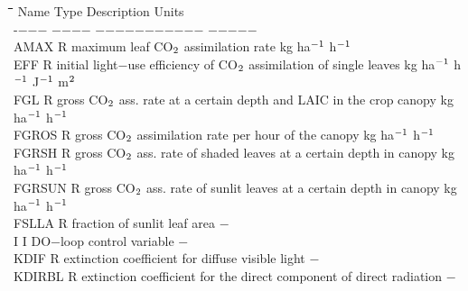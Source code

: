 \begin{tabbing}
\hspace{1.27cm}\=\hspace{1.27cm}\=\hspace{1.27cm}\=\hspace{1.27cm}\=%
\hspace{1.27cm}\=\hspace{1.27cm}\=\hspace{1.27cm}\=\hspace{1.27cm}\=%
\hspace{1.27cm}\=\hspace{1.27cm}\=\kill
Name \> \> Type \> Description                                       \> \> \> \> \> \> \> Units\\
-$-$$-$$-$ \> \> $-$$-$$-$$-$\> $-$$-$$-$$-$$-$$-$$-$$-$$-$$-$$-$                                        \> \> \> \> \> \> \> $-$$-$$-$$-$$-$ \\
AMAX\> \> R   \> maximum leaf CO$_{{\rm 2}}$ assimilation rate       \> \> \> \> \> \> \> kg ha$^{{\rm -1}}$ h$^{{\rm -1}}$ \\
EFF \> \> R   \> initial light$-$use efficiency of CO$_{{\rm 2}}$ assimilation of single leaves  \> \> \> \> \> \> \> kg ha$^{{\rm -1}}$ h$^{{\rm -1}}$  J$^{{\rm -1}}$ m$^{{\rm 2}}$\\
FGL \> \> R   \> gross CO$_{{\rm 2}}$ ass. rate at a certain depth and LAIC in the crop canopy\> \> \> \> \> \> \> kg ha$^{{\rm -1}}$ h$^{{\rm -1}}$ \\
FGROS\> \> R   \> gross CO$_{{\rm 2}}$ assimilation rate per hour of the canopy \> \> \> \> \> \> \> kg ha$^{{\rm -1}}$ h$^{{\rm -1}}$ \\
FGRSH\> \> R   \> gross CO$_{{\rm 2}}$ ass. rate of shaded leaves at a certain depth in canopy \> \> \> \> \> \> \> kg ha$^{{\rm -1}}$ h$^{{\rm -1}}$ \\
FGRSUN\> \> R   \> gross CO$_{{\rm 2}}$ ass. rate of sunlit leaves at a certain depth in canopy  \> \> \> \> \> \> \> kg ha$^{{\rm -1}}$ h$^{{\rm -1}}$ \\
FSLLA   \> \> R   \> fraction of sunlit leaf area                 \> \> \> \> \> \> \> $-$\\
I       \> \> I   \> DO$-$loop control variable                    \> \> \> \> \> \> \> $-$\\
KDIF    \> \> R   \> extinction coefficient for diffuse visible light\> \> \> \> \> \> \> $-$\\
KDIRBL  \> \> R   \> extinction coefficient for the direct component of direct radiation\> \> \> \> \> \> \> $-$\\
$$
\end{tabbing}
